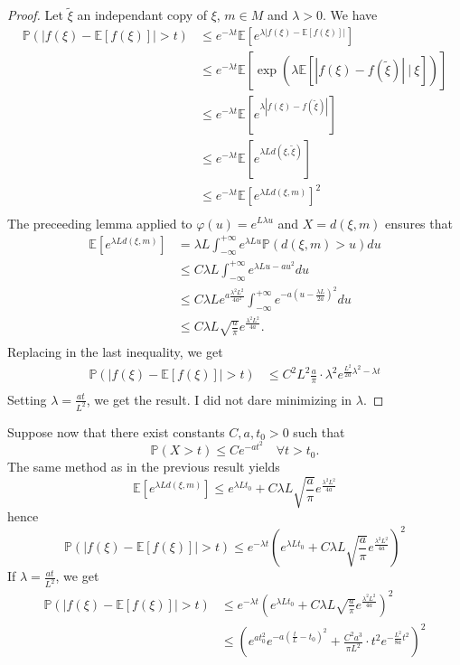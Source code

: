 \documentclass{article}
\begin{document}
\begin{proof}
Let $\tilde\xi$ an independant copy of $\xi$, $m\in M$ and $\lambda>0$. We have 
\[\begin{split}
\mathbb P(|f(\xi)  - \mathbb E[f(\xi)]| > t) & \leq e^{-\lambda t} \mathbb E[e^{\lambda |f(\xi)  - \mathbb E[f(\xi)]| } ] \\ 
		& \leq  e^{-\lambda t} \mathbb E[\exp({\lambda \mathbb E[|f(\xi)-f(\tilde \xi)| \ | \ \xi] })] \\
		& \leq  e^{-\lambda t} \mathbb E[e^{\lambda |f(\xi)-f(\tilde \xi)| }] \\
		& \leq  e^{-\lambda t} \mathbb E[e^{\lambda Ld(\xi , \tilde \xi) }] \\
		& \leq e^{-\lambda t} \mathbb E[e^{\lambda Ld(\xi , m) }]^2 \\
\end{split}
\]
The preceeding lemma applied to $\varphi(u) = e^{L\lambda u}$ and $X=d(\xi,m)$ ensures that
\[\begin{split}
\mathbb E [e^{\lambda L d(\xi , m)} ] & = \lambda L \int_{-\infty}^{+\infty} e^{\lambda L u} \mathbb P(d(\xi,m) > u) du \\
	& \leq C\lambda L \int_{-\infty}^{+\infty} e^{\lambda L u-au^2} du \\
	& \leq C\lambda L e^{a\frac{\lambda^2L^2}{4a^2}}\int_{-\infty}^{+\infty} e^{-a(u-\frac{\lambda L}{2a} )^2} du \\
	& \leq C\lambda L \sqrt{\frac{a}{\pi}} e^{\frac{\lambda^2L^2}{4a}} .\\
\end{split}\]
Replacing in the last inequality, we get
\[\begin{split}
\mathbb P(|f(\xi)  - \mathbb E[f(\xi)]| > t) & \leq C^2 L^2 \frac{a}{\pi} \cdot \lambda^2 e^{\frac{ L^2}{2a}\lambda^2 -\lambda t} \\ 
\end{split}
\]
Setting $\lambda = \frac{at}{L^2} $, we get the result. I did not dare minimizing in $\lambda$. 
\end{proof}

Suppose now that there exist constants $C , a , t_0>0$ such that 
$$\mathbb P( X > t ) \leq Ce^{-at^2} \quad \forall t >t_0.$$
The same method as in the previous result yields 
$$\mathbb E [e^{\lambda L d(\xi , m)} ] \leq e^{\lambda L t_0}  + C\lambda L \sqrt{\frac{a}{\pi}} e^{\frac{\lambda^2L^2}{4a}} $$
hence 
$$\mathbb P(|f(\xi)  - \mathbb E[f(\xi)]| > t) \leq e^{-\lambda t} \left(e^{\lambda L t_0}  + C\lambda L \sqrt{\frac{a}{\pi}} e^{\frac{\lambda^2L^2}{4a}}\right)^2 $$
If $\lambda = \frac{at}{L^2} $, we get
\[\begin{split}
\mathbb P(|f(\xi)  - \mathbb E[f(\xi)]| > t) & \leq e^{-\lambda t} \left(e^{\lambda L t_0}  + C\lambda L \sqrt{\frac{a}{\pi}} e^{\frac{\lambda^2L^2}{4a}}\right)^2 \\
					& \leq \left( e^{at_0^2}e^{-a(\frac{t}{L} - t_0)^2} + \frac{C^2a^3}{\pi L^2} \cdot t^2 e^{-\frac{ L^2}{8a}t^2} \right)^2 \\
\end{split}
\]
\end{document}
